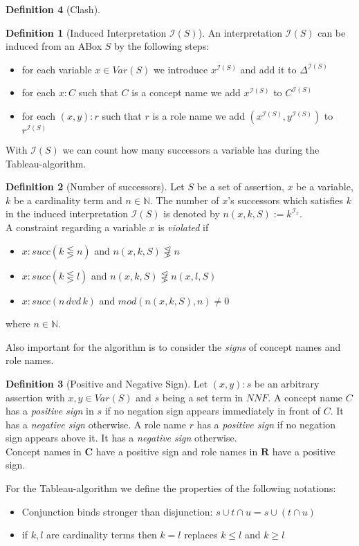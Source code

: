 \documentclass[a4paper,11pt]{scrartcl}
\theoremstyle{break}
\theoremstyle{definition}
\newtheorem{mydef}{Definition}
\begin{document}
\begin{mydef}[Clash]
\begin{mydef}[Induced Interpretation $\mathcal{I}(S)$]
An interpretation $\mathcal{I}(S)$ can be induced from an ABox $S$ by the following steps:
\begin{itemize}
\item for each variable $x\in Var(S)$ we introduce $x^{\mathcal{I}(S)}$ and add it to $\Delta^{\mathcal{I}(S)}$
\item for each $x:C$ such that $C$ is a concept name we add $x^{\mathcal{I}(S)}$ to $C^{\mathcal{I}(S)}$
\item for each $(x,y):r$ such that $r$ is a role name we add $(x^{\mathcal{I}(S)},y^{\mathcal{I}(S)})$ to $r^{\mathcal{I}(S)}$
\end{itemize}
\end{mydef}
With $\mathcal{I}(S)$ we can count how many successors a variable has during the Tableau-algorithm.
\begin{mydef}[Number of successors]
Let $S$ be a set of assertion, $x$ be a variable, $k$ be a cardinality term and $n\in\mathbb{N}$. The number of $x$'s successors which satisfies $k$ in the induced interpretation $\mathcal{I}(S)$ is denoted by $n(x,k,S):=k^{\mathcal{I}_x}$.\\
A constraint regarding a variable $x$ is \textit{violated} if
\begin{itemize}
\item $x:succ(k\lesseqgtr n)$ and $n(x,k,S)\not\lesseqgtr n$
\item $x:succ(k\lesseqgtr l)$ and $n(x,k,S)\not\lesseqgtr n(x,l,S)$
\item $x:succ(n\,dvd\,k)$ and $mod(n(x,k,S),n)\neq 0$
\end{itemize} 
where $n\in\mathbb{N}$.
\end{mydef}
Also important for the algorithm is to consider the \textit{signs} of concept names and role names.
\begin{mydef}[Positive and Negative Sign]
Let $(x,y):s$ be an arbitrary assertion with $x,y\in Var(S)$ and $s$ being a set term in $NNF$. A concept name $C$ has a \textit{positive sign} in $s$ if no negation sign appears immediately in front of $C$. It has a \textit{negative sign} otherwise. A role name $r$ has a \textit{positive sign} if no negation sign appears above it. It has a \textit{negative sign} otherwise.\\
Concept names in $\mathbf{C}$ have a positive sign and role names in $\mathbf{R}$ have a positive sign.
\end{mydef}
For the Tableau-algorithm we define the properties of the following notations:
\begin{itemize}
\item Conjunction binds stronger than disjunction: $s\cup t\cap u = s\cup (t\cap u)$
\item if $k,l$ are cardinality terms then $k=l$ replaces $k\leq l$ and $k\geq l$ 
\end{itemize}

\end{mydef}
\end{document}
